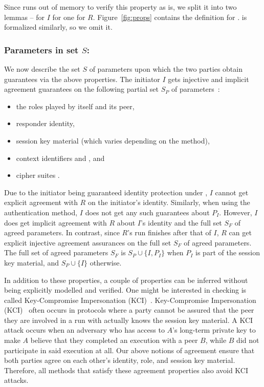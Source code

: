 Since \mTamarin{} runs out of memory to verify this property as is, we split it into two lemmas -- \mPredImpI{} for $I$ for one \mPredImpR{} for $R$.
%
Figure~\ref{fig:props} contains the definition for \mPredImpI{}.
%
\mPredImpR{} is formalized similarly, so we omit it.


\subsubsection{Parameters in set $S$:}
\label{sec:agreedParams}
We now describe the set $S$ of parameters upon which the two parties obtain guarantees via the above properties.
%
The initiator $I$ gets injective and implicit agreement guarantees on the
following partial set $S_P$ of parameters~\cite{Norr21}:
\begin{itemize}
    \item the roles played by itself and its peer,
    \item responder identity,
    \item session key material (which varies depending on the \mEdhoc{} method),
    \item context identifiers \mCi{} and \mCr{}, and
    \item cipher suites \mSuites{}.
\end{itemize}
%

Due to the initiator being guaranteed identity protection under \mEdhoc{}, $I$ cannot get explicit agreement with $R$ on the initiator's identity.
%
Similarly, when using the \mStat{} authentication method, $I$ does not get any such guarantees about $P_{I}$.
%
However, $I$ does get implicit agreement with $R$ about $I$'s identity and the full set $S_{F}$ of agreed parameters.
%
In contrast, since $R$'s run finishes after that of $I$, $R$ can get explicit injective agreement assurances on the full set $S_{F}$ of agreed parameters.
%
The full set of agreed parameters $S_F$ is $S_P \cup \{I, P_I\}$ when $P_I$ is part of the session key material, and $S_P \cup \{I\}$ otherwise.
%

In addition to these properties, a couple of properties can be inferred without being explicitly modelled and verified. 
%
One might be interested in checking is called Key-Compromise Impersonation (KCI)~\cite{DBLP:conf/ima/Blake-WilsonJM97}.
%
Key-Compromise Impersonation (KCI)~\cite{DBLP:conf/ima/Blake-WilsonJM97} often occurs in protocols where a party cannot be assured that the peer they are involved in a run with actually knows the session key material.
%
A KCI attack occurs when an adversary who has access to $A$'s long-term private key to make $A$ believe that they completed an execution with a peer $B$, while $B$ did not participate in said execution at all.
%
Our above notions of agreement ensure that both parties agree on each other's identity, role, and session key material.
%
Therefore, all \mEdhoc{} methods that satisfy these agreement properties also avoid KCI attacks.

